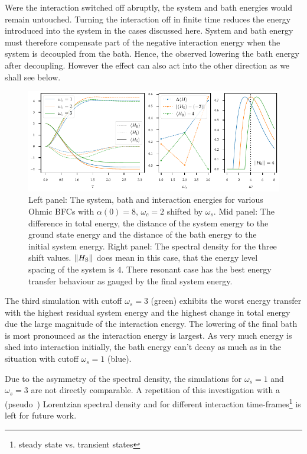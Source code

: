 Were the interaction switched off abruptly, the system and bath
energies would remain untouched. Turning the interaction off in finite
time reduces the energy introduced into the system in the cases
discussed here. System and bath energy must therefore compensate part
of the negative interaction energy when the system is decoupled from
the bath. Hence, the observed lowering the bath energy after
decoupling. However the effect can also act into the other direction
as we shall see below.
\begin{figure}[htp]
  \centering
  \includegraphics{figs/one_bath_syst/resonance_analysis}
  \caption{\label{fig:resonance_analysis} Left
    panel: The system, bath and interaction energies for various Ohmic
    BFCs with \(α(0)=8,\,ω_c=2\) shifted by \(ω_s\). Mid panel: The
    difference in total energy, the distance of the system energy to
    the ground state energy and the distance of the bath energy to the
    initial system energy. Right panel: The spectral density for the
    three shift values. \(\norm{H_{\mathrm{S}}}\) does mean in this case, that
    the energy level spacing of the system is \(4\). There resonant
    case has the best energy transfer behaviour as gauged by the final
    system energy.}
\end{figure}

The third simulation with cutoff \(ω_s=3\) (green) exhibits the worst
energy transfer with the highest residual system energy and the
highest change in total energy due the large magnitude of the
interaction energy.  The lowering of the final bath is most pronounced
as the interaction energy is largest. As very much energy is shed into
interaction initially, the bath energy can't decay as much as in the
situation with cutoff \(ω_{s}=1\) (blue).


Due to the asymmetry of the spectral density, the simulations for
\(ω_s=1\) and \(ω_s=3\) are not directly comparable. A repetition of
this investigation with a (pseudo~\cite{Mukherjee2020Jan}) Lorentzian
spectral density and for different interaction
time-frames\footnote{steady state vs. transient states} is left for
future work.


